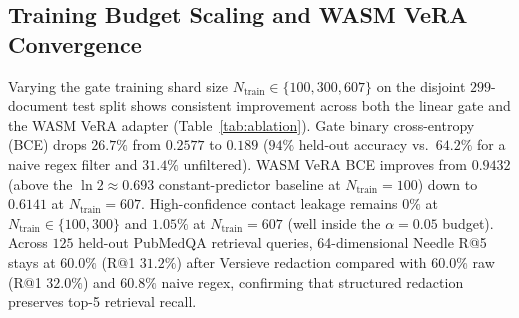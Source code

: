 \documentclass{article}
\begin{document}
\subsection{Training Budget Scaling and WASM VeRA Convergence}
Varying the gate training shard size $N_{\text{train}} \in \{100, 300, 607\}$ on the disjoint $299$-document test split shows consistent improvement across both the linear gate and the WASM VeRA adapter (Table~\ref{tab:ablation}). Gate binary cross-entropy (BCE) drops $26.7\%$ from $0.2577$ to $0.189$ ($94\%$ held-out accuracy vs.\ $64.2\%$ for a naive regex filter and $31.4\%$ unfiltered). WASM VeRA BCE improves from $0.9432$ (above the $\ln 2 \approx 0.693$ constant-predictor baseline at $N_{\text{train}}=100$) down to $0.6141$ at $N_{\text{train}}=607$. High-confidence contact leakage remains $0\%$ at $N_{\text{train}} \in \{100, 300\}$ and $1.05\%$ at $N_{\text{train}}=607$ (well inside the $\alpha=0.05$ budget). Across $125$ held-out PubMedQA retrieval queries, 64-dimensional Needle R@5 stays at $60.0\%$ (R@1 $31.2\%$) after Versieve redaction compared with $60.0\%$ raw (R@1 $32.0\%$) and $60.8\%$ naive regex, confirming that structured redaction preserves top-5 retrieval recall.

\begin{table}[t]
\caption{Held-out scaling ablation ($n_{\text{test}}=299$). Gate BCE measures the 520-dim logistic scorer; VeRA BCE measures \texttt{mle\_dl\_vera\_loss\_grad} in \texttt{verisieve\_dl.wasm}.}
\label{tab:ablation}
\vskip 0.08in
\begin{center}
\end{center}
\vskip -0.14in
\end{table}
\end{document}
